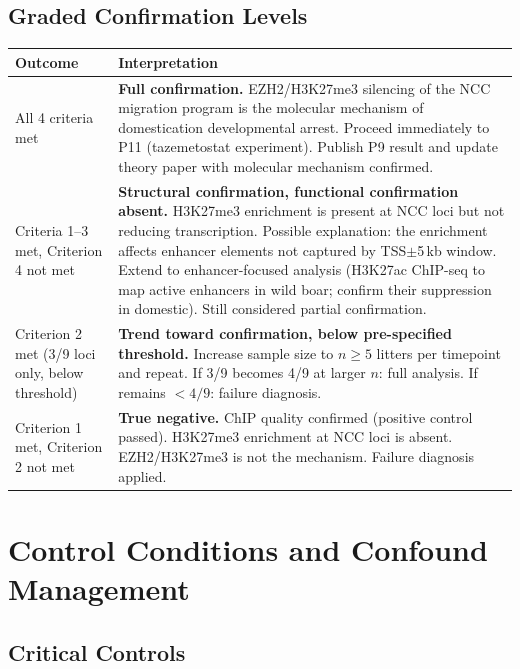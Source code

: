 \documentclass[10pt, a4paper]{article}
\begin{document}
\subsection{Graded Confirmation Levels}

\begin{center}
\small
\begin{tabular}{p{3.5cm}p{9.5cm}}
\toprule
\textbf{Outcome} & \textbf{Interpretation} \\
\midrule
All 4 criteria met &
\textbf{Full confirmation.} EZH2/H3K27me3
silencing of the NCC migration program is
the molecular mechanism of domestication
developmental arrest. Proceed immediately
to P11 (tazemetostat experiment).
Publish P9 result and update theory paper
with molecular mechanism confirmed. \\[0.4em]
Criteria 1--3 met,
Criterion 4 not met &
\textbf{Structural confirmation, functional
confirmation absent.} H3K27me3 enrichment is
present at NCC loci but not reducing
transcription. Possible explanation: the
enrichment affects enhancer elements not
captured by TSS$\pm$5\,kb window. Extend
to enhancer-focused analysis (H3K27ac
ChIP-seq to map active enhancers in wild
boar; confirm their suppression in domestic).
Still considered partial confirmation. \\[0.4em]
Criterion 2 met (3/9 loci only,
below threshold) &
\textbf{Trend toward confirmation, below
pre-specified threshold.} Increase sample
size to $n \geq 5$ litters per timepoint
and repeat. If 3/9 becomes 4/9 at larger
$n$: full analysis. If remains $< 4/9$:
failure diagnosis. \\[0.4em]
Criterion 1 met,
Criterion 2 not met &
\textbf{True negative.} ChIP quality
confirmed (positive control passed).
H3K27me3 enrichment at NCC loci is absent.
EZH2/H3K27me3 is not the mechanism.
Failure diagnosis applied. \\
\bottomrule
\end{tabular}
\end{center}

\section{Control Conditions and
Confound Management}
\label{sec:controls}

\subsection{Critical Controls}
\end{document}
